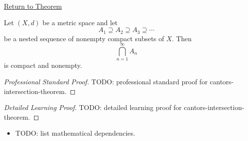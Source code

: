 \newpage
{}
\label{prf:cantors-intersection-theorem}

\begin{remark*}[Return]
\hyperref[thm:cantors-intersection-theorem]{Return to Theorem}
\end{remark*}

\begin{theorem*}
Let $(X, d)$ be a metric space and let
\[
  A_1 \supseteq A_2 \supseteq A_3 \supseteq \cdots
\]
be a nested sequence of nonempty compact subsets of $X$. Then
\[
  \bigcap_{n=1}^{\infty} A_n
\]
is compact and nonempty.
\end{theorem*}

\begin{proof}[Professional Standard Proof]
\LRAProofBodyStart
TODO: professional standard proof for cantors-intersection-theorem.
\end{proof}

\begin{proof}[Detailed Learning Proof]
\LRAProofBodyStart
TODO: detailed learning proof for cantors-intersection-theorem.
\end{proof}

\begin{remark*}
\end{remark*}

\begin{dependencies}
\begin{itemize}
  \item TODO: list mathematical dependencies.
\end{itemize}
\end{dependencies}

\clearpage
